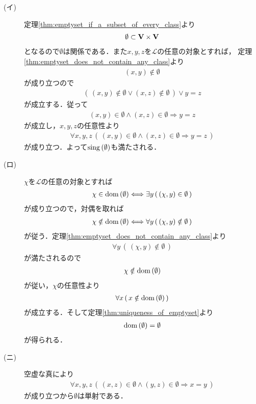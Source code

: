 	\begin{prf}\mbox{}
		\begin{description}
			\item[(イ)]
				定理\ref{thm:emptyset_if_a_subset_of_every_class}より
				\begin{align}
					\emptyset \subset \mathbf{V} \times \mathbf{V}
				\end{align}
				となるので$\emptyset$は関係である．また$x,y,z$を$\mathcal{L}$の任意の対象とすれば，
				定理\ref{thm:emptyset_does_not_contain_any_class}より
				\begin{align}
					(x,y) \notin \emptyset
				\end{align}
				が成り立つので
				\begin{align}
					\left(\, (x,y) \notin \emptyset \vee (x,z) \notin \emptyset\, \right) \vee y = z
				\end{align}
				が成立する．従って
				\begin{align}
					(x,y) \in \emptyset \wedge (x,z) \in \emptyset \Longrightarrow y = z
				\end{align}
				が成立し，$x,y,z$の任意性より
				\begin{align}
					\forall x,y,z\, \left(\, (x,y) \in \emptyset \wedge (x,z) \in \emptyset
					\Longrightarrow y = z\, \right)
				\end{align}
				が成り立つ．よって$\operatorname*{sing} \left(\emptyset\right)$も満たされる．
		
			\item[(ロ)] $\chi$を$\mathcal{L}$の任意の対象とすれば
				\begin{align}
					\chi \in \operatorname*{dom} \left(\emptyset\right) \Longleftrightarrow 
					\exists y\, (\, (\chi,y) \in \emptyset\, )
				\end{align}
				が成り立つので，対偶を取れば
				\begin{align}
					\chi \notin \operatorname*{dom} \left(\emptyset\right) \Longleftrightarrow 
					\forall y\, (\, (\chi,y) \notin \emptyset\, )
				\end{align}
				が従う．定理\ref{thm:emptyset_does_not_contain_any_class}より
				\begin{align}
					\forall y\, (\, (\chi,y) \notin \emptyset\, )
				\end{align}
				が満たされるので
				\begin{align}
					\chi \notin \operatorname*{dom} \left(\emptyset\right)
				\end{align}
				が従い，$\chi$の任意性より
				\begin{align}
					\forall x\, (\, x \notin \operatorname*{dom} \left(\emptyset\right)\, )
				\end{align}
				が成立する．そして定理\ref{thm:uniqueness_of_emptyset}より
				\begin{align}
					\operatorname*{dom} \left(\emptyset\right) = \emptyset
				\end{align}
				が得られる．
			
			\item[(ニ)] 空虚な真により
				\begin{align}
					\forall x,y,z\, \left(\, (x,z) \in \emptyset \wedge (y,z) \in \emptyset \Longrightarrow x = y\, \right)
				\end{align}
				が成り立つから$\emptyset$は単射である．
				\QED
		\end{description}
	\end{prf}
	
